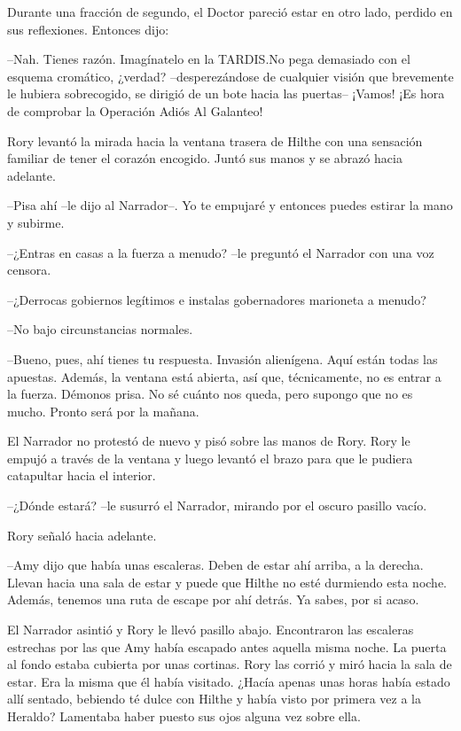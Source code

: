 {Durante una fracción de segundo, el Doctor pareció estar en otro lado,
perdido en sus reflexiones. Entonces dijo:}

{--Nah. Tienes razón. Imagínatelo en la TARDIS.\@ No pega demasiado con
	el esquema cromático, ¿verdad? --desperezándose de cualquier visión que
	brevemente le hubiera sobrecogido, se dirigió de un bote hacia las
puertas-- ¡Vamos! ¡Es hora de comprobar la Operación Adiós Al Galanteo!}

\mbox{}

{Rory levantó la mirada hacia la ventana trasera de Hilthe con una
	sensación familiar de tener el corazón encogido. Juntó sus manos y se
abrazó hacia adelante.}

{--Pisa ahí --le dijo al Narrador--. Yo te empujaré y entonces puedes
estirar la mano y subirme.}

{--¿Entras en casas a la fuerza a menudo? --le preguntó el Narrador
con una voz censora.}

{--¿Derrocas gobiernos legítimos e instalas gobernadores marioneta a
menudo?}

{--No bajo circunstancias normales.}

{--Bueno, pues, ahí tienes tu respuesta. Invasión alienígena. Aquí
	están todas las apuestas. Además, la ventana está abierta, así que,
	técnicamente, no es entrar a la fuerza. Démonos prisa. No sé cuánto nos
queda, pero supongo que no es mucho. Pronto será por la mañana.}

{El Narrador no protestó de nuevo y pisó sobre las manos de Rory. Rory
	le empujó a través de la ventana y luego levantó el brazo para que le
pudiera catapultar hacia el interior.}

{--¿Dónde estará? --le susurró el Narrador, mirando por el oscuro
pasillo vacío.}

{Rory señaló hacia adelante.}

{--Amy dijo que había unas escaleras. Deben de estar ahí arriba, a la
	derecha. Llevan hacia una sala de estar y puede que Hilthe no esté
	durmiendo esta noche. Además, tenemos una ruta de escape por ahí detrás.
Ya sabes, por si acaso.}

{El Narrador asintió y Rory le llevó pasillo abajo. Encontraron las
	escaleras estrechas por las que Amy había escapado antes aquella misma
	noche. La puerta al fondo estaba cubierta por unas cortinas. Rory las
	corrió y miró hacia la sala de estar. Era la misma que él había
	visitado. ¿Hacía apenas unas horas había estado allí sentado, bebiendo
	té dulce con Hilthe y había visto por primera vez a la Heraldo?
Lamentaba haber puesto sus ojos alguna vez sobre ella.}

